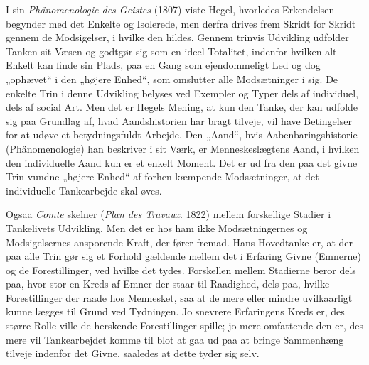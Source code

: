 \documentclass[12pt,a4paper]{book}
\newcommand{\apage}[1]{\marginnote{\footnotesize\textit{[#1]}}}
\begin{document}
I sin \emph{Phänomenologie des
Geistes} (1807) viste Hegel, hvorledes Erkendelsen begynder med det
Enkelte og Isolerede, men derfra drives frem Skridt for Skridt gennem de
Modsigelser, i hvilke den hildes. Gennem trinvis Udvikling udfolder
Tanken sit Væsen og godtgør sig som en ideel Totalitet, indenfor hvilken
alt Enkelt kan finde sin Plads, paa en Gang som ejendommeligt Led og dog
„ophævet“ i den „højere Enhed“, som omslutter alle Modsætninger i sig.
De \apage{112} enkelte Trin i denne Udvikling belyses ved Exempler og Typer dels af
individuel, dels af social Art. Men det er Hegels Mening, at kun den
Tanke, der kan udfolde sig paa Grundlag af, hvad Aandshistorien har
bragt tilveje, vil have Betingelser for at udøve et betydningsfuldt
Arbejde. Den „Aand“, hvis Aabenbaringshistorie (Phänomenologie) han
beskriver i sit Værk, er Menneskeslægtens Aand, i hvilken den
individuelle Aand kun er et enkelt Moment. Det er ud fra den paa det
givne Trin vundne „højere Enhed“ af forhen kæmpende Modsætninger, at det
individuelle Tankearbejde skal øves.

Ogsaa \emph{Comte} skelner (\emph{Plan des Travaux}. 1822) mellem
forskellige Stadier i Tankelivets Udvikling. Men det er hos ham ikke
Modsætningernes og Modsigelsernes ansporende Kraft, der fører fremad.
Hans Hovedtanke er, at der paa alle Trin gør sig et Forhold gældende
mellem det i Erfaring Givne (Emnerne) og de Forestillinger, ved hvilke
det tydes. Forskellen mellem Stadierne beror dels paa, hvor stor en
Kreds af Emner der staar til Raadighed, dels paa, hvilke Forestillinger
der raade hos Mennesket, saa at de mere eller mindre uvilkaarligt kunne
lægges til Grund ved Tydningen. Jo snevrere Erfaringens Kreds er, des
større Rolle ville de herskende Forestillinger spille; jo mere
omfattende den er, des mere vil Tankearbejdet komme til blot at gaa ud
paa at bringe Sammenhæng tilveje indenfor det Givne, saaledes at dette
tyder sig selv.
\end{document}
